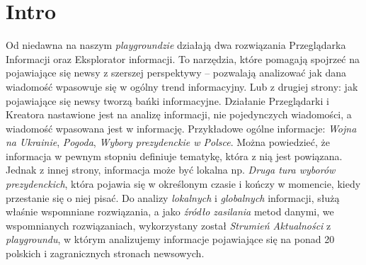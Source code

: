 \section{Intro}

Od niedawna na naszym \textit{playgroundzie} działają dwa rozwiązania Przeglądarka Informacji oraz Eksplorator informacji. 
To narzędzia, które pomagają spojrzeć na pojawiające się newsy z szerszej perspektywy -- pozwalają analizować 
jak dana wiadomość wpasowuje się w ogólny trend informacyjny. Lub z drugiej strony: jak pojawiające się newsy 
tworzą bańki informacyjne. Działanie Przeglądarki i Kreatora nastawione jest na analizę informacji, nie pojedynczych 
wiadomości, a wiadomość wpasowana jest w informację. Przykładowe ogólne informacje: \textit{Wojna na Ukrainie}, 
\textit{Pogoda}, \textit{Wybory prezydenckie w Polsce}. Można powiedzieć, że informacja w pewnym stopniu definiuje tematykę, 
która z nią jest powiązana. Jednak z innej strony, informacja może być lokalna np. \textit{Druga tura wyborów prezydenckich}, 
która pojawia się w określonym czasie i kończy w momencie, kiedy przestanie się o niej pisać. 
Do analizy \textit{lokalnych} i \textit{globalnych} informacji, służą właśnie wspomniane rozwiązania,
a jako \textit{źródło zasilania} metod danymi, we wspomnianych rozwiązaniach, 
wykorzystany został \textit{Strumień Aktualności} z \textit{playgroundu}, 
w którym analizujemy informacje pojawiające się na ponad 20 polskich i zagranicznych stronach newsowych.

